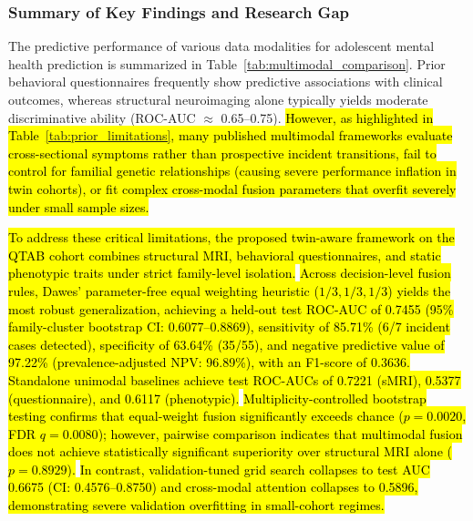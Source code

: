 \documentclass[10pt,letterpaper]{article}
\begin{document}
                \subsubsection*{Summary of Key Findings and Research Gap}

        The predictive performance of various data modalities for adolescent mental health prediction is summarized in Table~\ref{tab:multimodal_comparison}. Prior behavioral questionnaires frequently show predictive associations with clinical outcomes, whereas structural neuroimaging alone typically yields moderate discriminative ability (ROC-AUC $\approx$ 0.65--0.75). \hl{However, as highlighted in Table~\ref{tab:prior_limitations}, many published multimodal frameworks evaluate cross-sectional symptoms rather than prospective incident transitions, fail to control for familial genetic relationships (causing severe performance inflation in twin cohorts), or fit complex cross-modal fusion parameters that overfit severely under small sample sizes.}

        \hl{To address these critical limitations, the proposed twin-aware framework on the QTAB cohort combines structural MRI, behavioral questionnaires, and static phenotypic traits under strict family-level isolation.} \hl{Across decision-level fusion rules, Dawes' parameter-free equal weighting heuristic ($1/3, 1/3, 1/3$) yields the most robust generalization, achieving a held-out test ROC-AUC of 0.7455 (95\% family-cluster bootstrap CI: 0.6077--0.8869), sensitivity of 85.71\% (6/7 incident cases detected), specificity of 63.64\% (35/55), and negative predictive value of 97.22\% (prevalence-adjusted NPV: 96.89\%), with an F1-score of 0.3636.} \hl{Standalone unimodal baselines achieve test ROC-AUCs of 0.7221 (sMRI), 0.5377 (questionnaire), and 0.6117 (phenotypic).} \hl{Multiplicity-controlled bootstrap testing confirms that equal-weight fusion significantly exceeds chance ($p = 0.0020$, FDR $q = 0.0080$); however, pairwise comparison indicates that multimodal fusion does not achieve statistically significant superiority over structural MRI alone ($p = 0.8929$).} \hl{In contrast, validation-tuned grid search collapses to test AUC 0.6675 (CI: 0.4576--0.8750) and cross-modal attention collapses to 0.5896, demonstrating severe validation overfitting in small-cohort regimes.}
\end{document}
